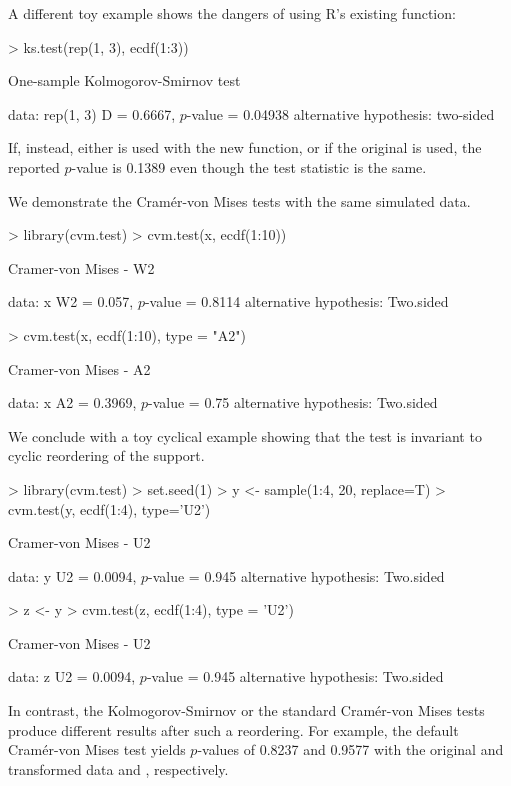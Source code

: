 A different toy example shows the dangers of using R's existing
 function:
\begin{Schunk}
\begin{Sinput}
> ks.test(rep(1, 3), ecdf(1:3))
\end{Sinput}
\begin{Soutput}
	One-sample Kolmogorov-Smirnov test

data:  rep(1, 3) 
D = 0.6667, $p$-value = 0.04938
alternative hypothesis: two-sided 
\end{Soutput}
\end{Schunk}
If, instead, either  is used with the new
 function, or if the original 
is used, the reported $p$-value is 0.1389 even though the test statistic
is the same.

We demonstrate the Cram\'{e}r-von Mises tests with the same
simulated data. 
\begin{Schunk}
\begin{Sinput}
> library(cvm.test)
> cvm.test(x, ecdf(1:10))
\end{Sinput}
\begin{Soutput}
	Cramer-von Mises - W2

data:  x 
W2 = 0.057, $p$-value = 0.8114
alternative hypothesis: Two.sided 
\end{Soutput}
\begin{Sinput}
> cvm.test(x, ecdf(1:10), type = "A2")
\end{Sinput}
\begin{Soutput}
	Cramer-von Mises - A2

data:  x 
A2 = 0.3969, $p$-value = 0.75
alternative hypothesis: Two.sided 
\end{Soutput}
\end{Schunk}

We conclude with a toy cyclical example showing that the test is
invariant to cyclic reordering of the support.
\begin{Schunk}
\begin{Sinput}
> library(cvm.test)
> set.seed(1)
> y <- sample(1:4, 20, replace=T)
> cvm.test(y, ecdf(1:4), type='U2')
\end{Sinput}
\begin{Soutput}
	Cramer-von Mises - U2

data:  y 
U2 = 0.0094, $p$-value = 0.945
alternative hypothesis: Two.sided 
\end{Soutput}
\begin{Sinput}
> z <- y%
> cvm.test(z, ecdf(1:4), type = 'U2')
\end{Sinput}
\begin{Soutput}
	Cramer-von Mises - U2

data:  z 
U2 = 0.0094, $p$-value = 0.945
alternative hypothesis: Two.sided 
\end{Soutput}
\end{Schunk}
In contrast, the Kolmogorov-Smirnov or the standard Cram\'{e}r-von Mises tests
produce different results after such a reordering. For example, the default
Cram\'{e}r-von Mises test yields $p$-values of 0.8237 and 0.9577 with the original
and transformed data  and , respectively.




